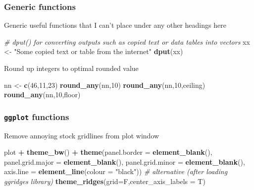 \documentclass[10,portrait]{article}
\newenvironment{Shaded}{\begin{snugshade}}{\end{snugshade}}
\newcommand{\KeywordTok}[1]{\textcolor[rgb]{0.13,0.29,0.53}{\textbf{#1}}}
\newcommand{\DataTypeTok}[1]{\textcolor[rgb]{0.13,0.29,0.53}{#1}}
\newcommand{\DecValTok}[1]{\textcolor[rgb]{0.00,0.00,0.81}{#1}}
\newcommand{\StringTok}[1]{\textcolor[rgb]{0.31,0.60,0.02}{#1}}
\newcommand{\CommentTok}[1]{\textcolor[rgb]{0.56,0.35,0.01}{\textit{#1}}}
\newcommand{\OperatorTok}[1]{\textcolor[rgb]{0.81,0.36,0.00}{\textbf{#1}}}
\newcommand{\NormalTok}[1]{#1}
\begin{document}
\subsubsection{Generic functions}\label{generic-functions}

Generic useful functions that I can't place under any other headings
here

\begin{Shaded}
\begin{Highlighting}[]
\CommentTok{# dput() for converting outputs such as copied text or data tables into vectors}
\NormalTok{xx <-}\StringTok{ "Some copied text or table from the internet"}
\KeywordTok{dput}\NormalTok{(xx)}
\end{Highlighting}
\end{Shaded}

Round up integers to optimal rounded value

\begin{Shaded}
\begin{Highlighting}[]
\NormalTok{nn <-}\StringTok{ }\KeywordTok{c}\NormalTok{(}\DecValTok{46}\NormalTok{,}\DecValTok{11}\NormalTok{,}\DecValTok{23}\NormalTok{)}
\KeywordTok{round_any}\NormalTok{(nn,}\DecValTok{10}\NormalTok{)}
\KeywordTok{round_any}\NormalTok{(nn,}\DecValTok{10}\NormalTok{,ceiling)}
\KeywordTok{round_any}\NormalTok{(nn,}\DecValTok{10}\NormalTok{,floor)}
\end{Highlighting}
\end{Shaded}

\subsubsection{\texorpdfstring{\texttt{ggplot}
functions}{ggplot functions}}\label{ggplot-functions}

Remove annoying stock gridlines from plot window

\begin{Shaded}
\begin{Highlighting}[]
\NormalTok{plot }\OperatorTok{+}\StringTok{ }\KeywordTok{theme_bw}\NormalTok{() }\OperatorTok{+}\StringTok{ }
\StringTok{  }\KeywordTok{theme}\NormalTok{(}\DataTypeTok{panel.border =} \KeywordTok{element_blank}\NormalTok{(), }\DataTypeTok{panel.grid.major =} \KeywordTok{element_blank}\NormalTok{(),}
                            \DataTypeTok{panel.grid.minor =} \KeywordTok{element_blank}\NormalTok{(), }\DataTypeTok{axis.line =} \KeywordTok{element_line}\NormalTok{(}\DataTypeTok{colour =} \StringTok{"black"}\NormalTok{))}
\CommentTok{# alternative (after loading ggridges library)}
\KeywordTok{theme_ridges}\NormalTok{(}\DataTypeTok{grid=}\NormalTok{F,}\DataTypeTok{center_axis_labels =}\NormalTok{ T)}
\end{Highlighting}
\end{Shaded}
\end{document}

